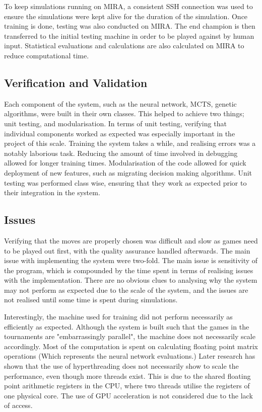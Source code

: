 \documentclass[12pt,a4paper]{article}
\begin{document}
        To keep simulations running on MIRA, a consistent SSH connection was used to ensure the simulations were kept alive for the duration of the simulation. Once training is done, testing was also conducted on MIRA. The end champion is then transferred to the initial testing machine in order to be played against by human input. Statistical evaluations and calculations are also calculated on MIRA to reduce computational time.

    \subsection{Verification and Validation}

        Each component of the system, such as the neural network, MCTS, genetic algorithms, were built in their own classes. This helped to achieve two things; unit testing, and modularisation. In terms of unit testing, verifying that individual components worked as expected was especially important in the project of this scale. Training the system takes a while, and realising errors was a notably laborious task. Reducing the amount of time involved in debugging allowed for longer training times. Modularisation of the code allowed for quick deployment of new features, such as migrating decision making algorithms. Unit testing was performed class wise, ensuring that they work as expected prior to their integration in the system.

    \subsection{Issues}
        Verifying that the moves are properly chosen was difficult and slow as games need to be played out first, with the quality assurance handled afterwards. The main issue with implementing the system were two-fold. The main issue is sensitivity of the program, which is compounded by the time spent in terms of realising issues with the implementation. There are no obvious clues to analysing why the system may not perform as expected due to the scale of the system, and the issues are not realised until some time is spent during simulations.

        Interestingly, the machine used for training did not perform necessarily as efficiently as expected. Although the system is built such that the games in the tournaments are "embarrassingly parallel", the machine does not necessarily scale accordingly. Most of the computation is spent on calculating floating point matrix operations (Which represents the neural network evaluations.) Later research has shown that the use of hyperthreading does not necessarily show to scale the performance, even though more threads exist. \cite{leng_empirical_2002} This is due to the shared floating point arithmetic registers in the CPU, where two threads utilise the registers of one physical core. The use of GPU acceleration is not considered due to the lack of access. 
    
\end{document}
